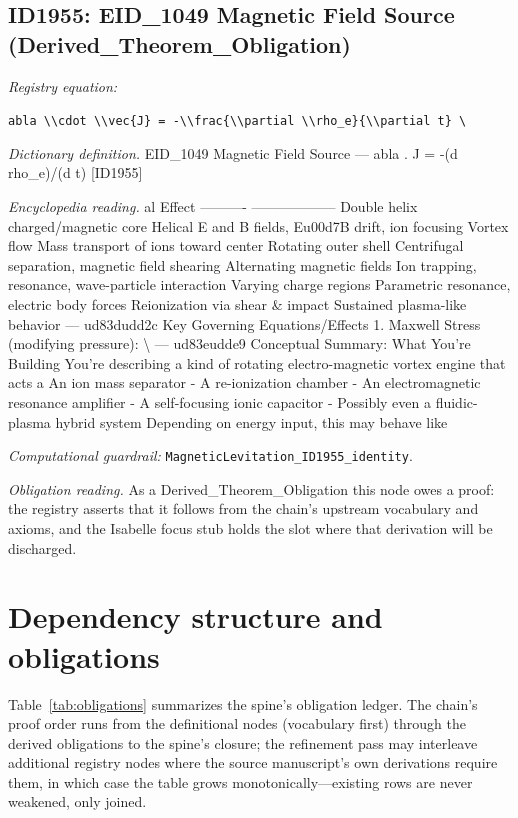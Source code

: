 \documentclass[11pt]{article}
\theoremstyle{remark}
\begin{document}
\subsection{ID1955: EID\_1049 Magnetic Field Source (Derived\_Theorem\_Obligation)}

\noindent\textit{Registry equation:}\par
{\small\texttt{abla \textbackslash{}\textbackslash{}cdot \textbackslash{}\textbackslash{}vec\{J\} = -\textbackslash{}\textbackslash{}frac\{\textbackslash{}\textbackslash{}partial \textbackslash{}\textbackslash{}rho\_e\}\{\textbackslash{}\textbackslash{}partial t\} \textbackslash{}}}\par\medskip
\noindent\textit{Dictionary definition.} EID\_1049 Magnetic Field Source --- abla . J = -(d rho\_e)/(d t) [ID1955]\par\medskip
\noindent\textit{Encyclopedia reading.} al Effect ---------- ------------------ Double helix charged/magnetic core Helical E and B fields, Eu00d7B drift, ion focusing Vortex flow Mass transport of ions toward center Rotating outer shell Centrifugal separation, magnetic field shearing Alternating magnetic fields Ion trapping, resonance, wave-particle interaction Varying charge regions Parametric resonance, electric body forces Reionization via shear \& impact Sustained plasma-like behavior --- ud83dudd2c Key Governing Equations/Effects 1. Maxwell Stress (modifying pressure): \textbackslash{} --- ud83eudde9 Conceptual Summary: What You're Building You're describing a kind of rotating electro-magnetic vortex engine that acts a An ion mass separator - A re-ionization chamber - An electromagnetic resonance amplifier - A self-focusing ionic capacitor - Possibly even a fluidic-plasma hybrid system Depending on energy input, this may behave like
\par\medskip\noindent\textit{Computational guardrail:} \texttt{MagneticLevitation\_ID1955\_identity}.
\par\medskip\noindent\textit{Obligation reading.} As a Derived\_Theorem\_Obligation this node owes a proof: the registry asserts that it follows from the chain's upstream vocabulary and axioms, and the Isabelle focus stub holds the slot where that derivation will be discharged.

\section{Dependency structure and obligations}
\label{sec:dep}

Table~\ref{tab:obligations} summarizes the spine's obligation ledger. The chain's proof order runs from the definitional nodes (vocabulary first) through the derived obligations to the spine's closure; the refinement pass may interleave additional registry nodes where the source manuscript's own derivations require them, in which case the table grows monotonically---existing rows are never weakened, only joined.
\end{document}
